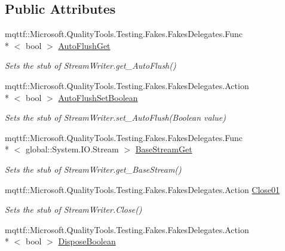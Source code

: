 \subsection*{Public Attributes}
\begin{DoxyCompactItemize}
\item 
mqttf\-::\-Microsoft.\-Quality\-Tools.\-Testing.\-Fakes.\-Fakes\-Delegates.\-Func\\*
$<$ bool $>$ \hyperlink{class_system_1_1_i_o_1_1_fakes_1_1_stub_stream_writer_ab3c240e7de54b657f2d4e87a3e1c54b0}{Auto\-Flush\-Get}
\begin{DoxyCompactList}\small\item\em Sets the stub of Stream\-Writer.\-get\-\_\-\-Auto\-Flush()\end{DoxyCompactList}\item 
mqttf\-::\-Microsoft.\-Quality\-Tools.\-Testing.\-Fakes.\-Fakes\-Delegates.\-Action\\*
$<$ bool $>$ \hyperlink{class_system_1_1_i_o_1_1_fakes_1_1_stub_stream_writer_ab6bcac5ad1d5d259cca124e7ab8922c9}{Auto\-Flush\-Set\-Boolean}
\begin{DoxyCompactList}\small\item\em Sets the stub of Stream\-Writer.\-set\-\_\-\-Auto\-Flush(\-Boolean value)\end{DoxyCompactList}\item 
mqttf\-::\-Microsoft.\-Quality\-Tools.\-Testing.\-Fakes.\-Fakes\-Delegates.\-Func\\*
$<$ global\-::\-System.\-I\-O.\-Stream $>$ \hyperlink{class_system_1_1_i_o_1_1_fakes_1_1_stub_stream_writer_a2dbf72d986db840d4b7367d4c187727e}{Base\-Stream\-Get}
\begin{DoxyCompactList}\small\item\em Sets the stub of Stream\-Writer.\-get\-\_\-\-Base\-Stream()\end{DoxyCompactList}\item 
mqttf\-::\-Microsoft.\-Quality\-Tools.\-Testing.\-Fakes.\-Fakes\-Delegates.\-Action \hyperlink{class_system_1_1_i_o_1_1_fakes_1_1_stub_stream_writer_a656c73a4ba5edfb514d5493323bbd53c}{Close01}
\begin{DoxyCompactList}\small\item\em Sets the stub of Stream\-Writer.\-Close()\end{DoxyCompactList}\item 
mqttf\-::\-Microsoft.\-Quality\-Tools.\-Testing.\-Fakes.\-Fakes\-Delegates.\-Action\\*
$<$ bool $>$ \hyperlink{class_system_1_1_i_o_1_1_fakes_1_1_stub_stream_writer_a23dc43f88b9cbf634623ab92604e7882}{Dispose\-Boolean}

\end{DoxyCompactItemize}
